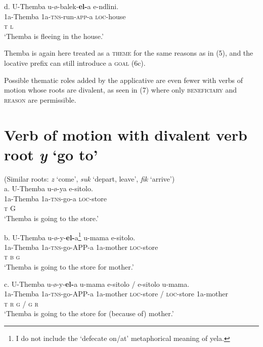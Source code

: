\documentclass[output=paper]{langsci/langscibook}
\begin{document}
\gll   d.  U-Themba   u-ø-balek-\textbf{el-}a        e-ndlini. \\
         1a-Themba     1a-\textsc{tns}{}-run-\textsc{app}{}-a  \textsc{loc}{}-house\\
         \textsc{t                  l}\\
\glt     ‘Themba is fleeing in the house.’
\z

Themba is again here treated as a \textsc{theme} for the same reasons as in (5), and the locative prefix can still introduce a \textsc{goal }(6c).

  Possible thematic roles added by the applicative are even fewer with verbs of motion whose roots are divalent, as seen in (7) where only \textsc{beneficiary} and \textsc{reason} are permissible. 

\chapter[Verb of motion with divalent verb root  y ‘go to’ ]{Verb of motion with divalent verb root  \textit{y }‘go to’ }
     (Similar roots: \textit{z} ‘come’, \textit{suk} ‘depart, leave’, \textit{fik} ‘arrive’)\\
\gll   a.  U-Themba    u-ø-ya      e-sitolo. \\
         1a-Themba     1a-\textsc{tns}{}-go-a   \textsc{loc}{}-store\\
         \textsc{t                }G\\
\glt     ‘Themba is going to the store.’
\z

\gll   b.  U-Themba   u-ø-y-\textbf{el-}a\footnote{ I do not include the ‘defecate on/at’ metaphorical meaning of yela.}     u-mama       e-sitolo. \\
         1a-Themba     1a-\textsc{tns}{}-go-APP-a   1a-mother      \textsc{loc}{}-store\\
         \textsc{t                  b           g}\\
\glt     ‘Themba is going to the store for mother.’
\z

\gll   c.  U-Themba  u-ø-y-\textbf{el-}a      u-mama    e-sitolo    / e-sitolo    u-mama.\\
         1a-Themba  1a-\textsc{tns}{}-go-APP-a    1a-mother  \textsc{loc}{}-store  / \textsc{loc}{}-store  1a-mother\\
         \textsc{t              r        g      / g      r}\\
\glt     ‘Themba is going to the store for (because of) mother.’
\z
\end{document}
